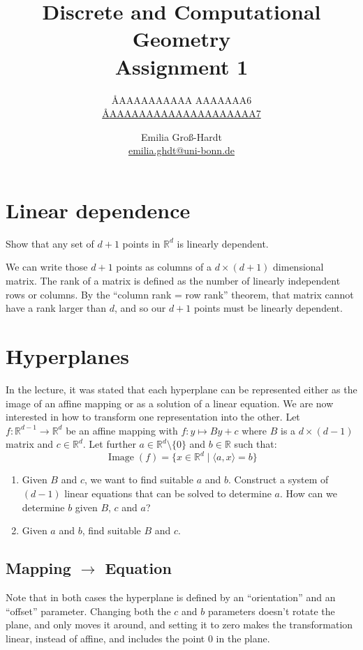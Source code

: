 \documentclass{article}
\title{Discrete and Computational Geometry \\ Assignment 1}
\author{
  \AA{AAAAAAAAAA AAAAAAA}{6} \\
  \href{mailto:\AA{AAAAAAAAAAAAAAAAAAAA}{7}}{\AA{AAAAAAAAAAAAAAAAAAAA}{7}}
  \and
  Emilia Groß-Hardt \\
  \href{mailto:emilia.ghdt@uni-bonn.de}{emilia.ghdt@uni-bonn.de}
}
\newcommand{\R}{\mathbb{R}}
\newcommand{\Rd}{\R^d}
\begin{document}
  \maketitle

  \section{Linear dependence}
  \begin{centerframebox}
    Show that any set of $d + 1$ points in $\Rd$ is linearly dependent.
  \end{centerframebox}
  We can write those $d + 1$ points as columns of a $d \times (d+1)$ dimensional matrix.
  The rank of a matrix is defined as the number of linearly independent rows or columns.
  By the ``column rank = row rank'' theorem, that matrix cannot have a rank larger than $d$,
  and so our $d + 1$ points must be linearly dependent.

  \section{Hyperplanes}
  \begin{centerframebox}
    In the lecture, it was stated that each hyperplane can be represented either as the image
    of an affine mapping or as a solution of a linear equation. We are now interested in how to
    transform one representation into the other. Let $f: \R^{d-1} \to \Rd$ be an affine mapping with
    $f: y \mapsto By + c$ where $B$ is a $d \times (d-1)$ matrix and $c \in \Rd$. Let further $a \in \Rd \setminus \{0\}$ and
    $b \in \R$ such that:
    \[ \operatorname{Image}(f) = \{x \in \Rd \mid \langle a,x \rangle = b\} \]
    \begin{enumerate}[label=(\roman*)]
      \item Given $B$ and $c$, we want to find suitable $a$ and $b$. Construct a system of $(d - 1)$ linear
      equations that can be solved to determine $a$. How can we determine $b$ given $B$, $c$ and $a$?
      \item Given $a$ and $b$, find suitable $B$ and $c$.
    \end{enumerate}
  \end{centerframebox}

  \subsection{Mapping $\to$ Equation}
  Note that in both cases the hyperplane is defined by an ``orientation'' and an ``offset'' parameter.
  Changing both the $c$ and $b$ parameters doesn't rotate the plane, and only moves it around,
  and setting it to zero makes the transformation linear, instead of affine, and includes the point $0$ in the plane.
\end{document}

